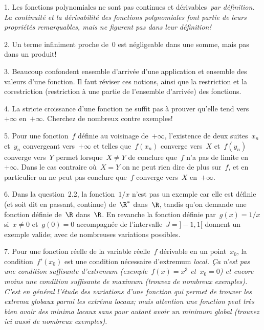 1. Les fonctions polynomiales ne sont pas continues et
dérivables~\em{par définition}. La continuité et la dérivabilité des
fonctions polynomiales font partie de leurs propriétés remarquables,
mais ne figurent pas dans leur définition!

2. Un terme infiniment proche de~$0$ est négligeable dans une
somme, mais pas dans un produit!

3. Beaucoup confondent ensemble d'arrivée d'une application et
ensemble des valeurs d'une fonction. Il faut réviser ces notions,
ainsi que la restriction et la corestriction (restriction à une partie
de l'ensemble d'arrivée) des fonctions.

4. La stricte croissance d'une fonction ne suffit pas à prouver
qu'elle tend vers~$+\infty$ en~$+\infty$. Cherchez de nombreux contre
exemples!

5. Pour une fonction~$f$ définie au voisinage de~$+\infty$,
l'existence de deux suites~$x_n$ et~$y_n$ convergeant vers~$+\infty$
et telles que~$f(x_n)$ converge vers~$X$ et~$f(y_n)$ converge vers~$Y$
permet lorsque~$X\not=Y$ de conclure que~$f$ n'a pas de limite
en~$+\infty$. Dans le cas contraire où~$X=Y$ on ne peut rien dire de
plus sur~$f$, et en particulier on ne peut pas conclure que~$f$
converge vers~$X$ en~$+\infty$.

6. Dans la question~2.2, la fonction~$1/x$ n'est pas un exemple car
elle est définie (et soit dit en passant, continue) de~$\R^*$
dans~$\R$, tandis qu'on demande une fonction définie de~$\R$
dans~$\R$. En revanche la fonction définie par~$g(x) = 1/x$
si~$x\not=0$ et~$g(0) = 0$ accompagnée de l'intervalle~$J=]-1, 1[$
donnent un exemple valide; avec de nombreuses variations possibles.

7. Pour une fonction réelle de la variable réelle~$f$ dérivable en un
point~$x_0$, la condition~$f'(x_0)$ est une condition nécessaire
d'extremum \em{local}. Ça n'est pas une condition suffisante
d'extremum (exemple~$f(x) = x^3$ et~$x_0 = 0$) et encore moins une
condition suffisante de maximum (trouvez de nombreux exemples).
C'est en général l'étude des variations d'une fonction qui permet de
trouver les extrema globaux parmi les extréma locaux; mais attention
une fonction peut très bien avoir des minima locaux sans pour autant
avoir un minimum global (trouvez ici aussi de nombreux exemples).

\bye
